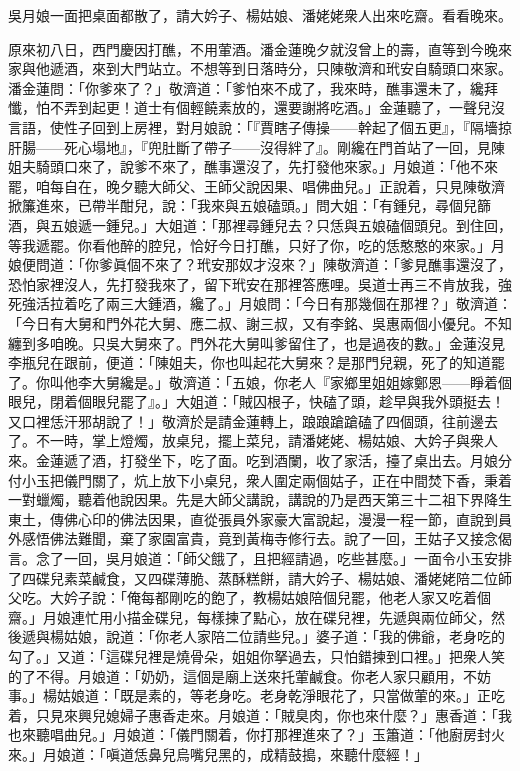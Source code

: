 吳月娘一面把桌面都散了，請大妗子、楊姑娘、潘姥姥衆人出來吃齋。看看晚來。

原來初八日，西門慶因打醮，不用葷酒。潘金蓮晚夕就沒曾上的壽，直等到今晚來家與他遞酒，來到大門站立。不想等到日落時分，只陳敬濟和玳安自騎頭口來家。潘金蓮問：「你爹來了？」敬濟道：「爹怕來不成了，我來時，醮事還未了，纔拜懺，怕不弄到起更！道士有個輕饒素放的，還要謝將吃酒。」金蓮聽了，一聲兒沒言語，使性子回到上房裡，對月娘說：「『賈瞎子傳操——幹起了個五更』，『隔墻掠肝腸——死心塌地』，『兜肚斷了帶子——沒得絆了』。{}剛纔在門首站了一回，見陳姐夫騎頭口來了，說爹不來了，醮事還沒了，先打發他來家。」月娘道：「他不來罷，咱每自在，晚夕聽大師父、王師父說因果、唱佛曲兒。」{}正說着，只見陳敬濟掀簾進來，已帶半酣兒，說：「我來與五娘磕頭。」問大姐：「有鍾兒，尋個兒篩酒，與五娘遞一鍾兒。」大姐道：「那裡尋鍾兒去？只恁與五娘磕個頭兒。到住回，等我遞罷。你看他醉的腔兒，恰好今日打醮，只好了你，吃的恁憨憨的來家。」月娘便問道：「你爹眞個不來了？玳安那奴才沒來？」陳敬濟道：「爹見醮事還沒了，恐怕家裡沒人，先打發我來了，留下玳安在那裡答應哩。吳道士再三不肯放我，強死強活拉着吃了兩三大鍾酒，{}纔了。」月娘問：「今日有那幾個在那裡？」敬濟道：「今日有大舅和門外花大舅、應二叔、謝三叔，又有李銘、吳惠兩個小優兒。不知纏到多咱晚。只吳大舅來了。門外花大舅叫爹留住了，也是過夜的數。」金蓮沒見李瓶兒在跟前，便道：「陳姐夫，你也叫起花大舅來？是那門兒親，死了的知道罷了。你叫他李大舅纔是。」{}敬濟道：「五娘，你老人『家鄉里姐姐嫁鄭恩——睜着個眼兒，閉着個眼兒罷了』。」大姐道：「賊囚根子，快磕了頭，趁早與我外頭挺去！{}又口裡恁汗邪胡說了！」敬濟於是請金蓮轉上，踉踉蹌蹌磕了四個頭，{}往前邊去了。不一時，掌上燈燭，放桌兒，擺上菜兒，請潘姥姥、楊姑娘、大妗子與衆人來。金蓮遞了酒，打發坐下，吃了面。吃到酒闌，收了家活，擡了桌出去。月娘分付小玉把儀門關了，炕上放下小桌兒，衆人圍定兩個姑子，正在中間焚下香，秉着一對蠟燭，聽着他說因果。先是大師父講說，講說的乃是西天第三十二祖下界降生東土，傳佛心印的佛法因果，直從張員外家豪大富說起，漫漫一程一節，直說到員外感悟佛法難聞，棄了家園富貴，竟到黃梅寺修行去。說了一回，王姑子又接念偈言。念了一回，吳月娘道：「師父餓了，且把經請過，吃些甚麼。」一面令小玉安排了四碟兒素菜鹹食，又四碟薄脆、蒸酥糕餅，請大妗子、楊姑娘、潘姥姥陪二位師父吃。大妗子說：「俺每都剛吃的飽了，教楊姑娘陪個兒罷，他老人家又吃着個齋。」月娘連忙用小描金碟兒，每樣揀了點心，放在碟兒裡，先遞與兩位師父，然後遞與楊姑娘，說道：「你老人家陪二位請些兒。」婆子道：「我的佛爺，老身吃的勾了。」又道：「這碟兒裡是燒骨朵，姐姐你拏過去，只怕錯揀到口裡。」把衆人笑的了不得。月娘道：「奶奶，這個是廟上送來托葷鹹食。你老人家只顧用，不妨事。」楊姑娘道：「既是素的，等老身吃。老身乾淨眼花了，只當做葷的來。」正吃着，只見來興兒媳婦子惠香走來。月娘道：「賊臭肉，你也來什麼？」惠香道：「我也來聽唱曲兒。」月娘道：「儀門關着，你打那裡進來了？」玉簫道：「他廚房封火來。」月娘道：「嗔道恁鼻兒烏嘴兒黑的，成精鼓搗，來聽什麼經！」{}

